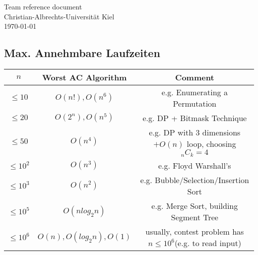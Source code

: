 \documentclass{article}
\begin{document}
\begin{titlepage}
  \centering
  \large
  \vspace*{\fill}
  \vspace{0.5\baselineskip}
  Team reference document\\
  \vspace{2.5\baselineskip}
  Christian-Albrechts-Universität Kiel \\
  \vspace{2\baselineskip}
  \today \\
  \vspace*{\fill}
\end{titlepage}
      
\begin{multicols*}{2}
  
  
  
\end{multicols*}

\subsection{Max. Annehmbare Laufzeiten}
\begin{table*}[h]
	\centering
	\begin{tabular}[t]{c c c}
		\hline
		$n$ & Worst AC Algorithm & Comment\\ [0.5ex]
		\hline
		\hline
		$\leq 10$ & $O(n!), O(n^6)$ & e.g. Enumerating a Permutation\\
		\hline
		$\leq 20$ & $O(2^n), O(n^5)$ & e.g. DP + Bitmask Technique\\
		\hline
		$\leq 50$ & $O(n^4)$ & e.g. DP with $3$ dimensions $+O(n)$ loop, choosing $_nC_k=4$\\
		\hline
		$\leq 10^2$ & $O(n^3)$ & e.g. Floyd Warshall’s\\
		\hline
		$\leq 10^3$ & $O(n^2)$ & e.g. Bubble/Selection/Insertion Sort\\
		\hline
		$\leq 10^5$ & $O(n log_2 n)$ & e.g. Merge Sort, building Segment Tree\\
		\hline
		$\leq 10^6$ & $O(n),O(log_2n),O(1)$ & usually, contest problem has $n\leq 10^6$(e.g. to read input)\\
		\hline
	\end{tabular}
\end{table*}
\end{document}
